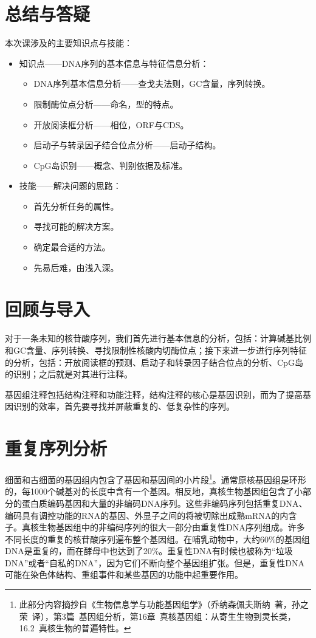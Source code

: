 \documentclass[11pt,a4paper,twoside]{book}
\begin{document}
\section{总结与答疑}
本次课涉及的主要知识点与技能：
\begin{itemize}
  \item 知识点——DNA序列的基本信息与特征信息分析：
    \begin{itemize}
      \item DNA序列基本信息分析——查戈夫法则，GC含量，序列转换。
      \item 限制酶位点分析——命名，型的特点。
      \item 开放阅读框分析——相位，ORF与CDS。
      \item 启动子与转录因子结合位点分析——启动子结构。
      \item CpG岛识别——概念、判别依据及标准。
    \end{itemize}
  \item 技能——解决问题的思路：
    \begin{itemize}
      \item 首先分析任务的属性。
      \item 寻找可能的解决方案。
      \item 确定最合适的方法。
      \item 先易后难，由浅入深。
    \end{itemize}
\end{itemize}

\section{回顾与导入}
对于一条未知的核苷酸序列，我们首先进行基本信息的分析，包括：计算碱基比例和GC含量、序列转换、寻找限制性核酸内切酶位点；接下来进一步进行序列特征的分析，包括：开放阅读框的预测、启动子和转录因子结合位点的分析、CpG岛的识别；之后就是对其进行注释。

基因组注释包括结构注释和功能注释，结构注释的核心是基因识别，而为了提高基因识别的效率，首先要寻找并屏蔽重复的、低复杂性的序列。

\section{重复序列分析}
细菌和古细菌的基因组内包含了基因和基因间的小片段\footnote{此部分内容摘抄自《生物信息学与功能基因组学》（乔纳森\textbullet 佩夫斯纳\ 著，孙之荣\ 译），第3篇\ 基因组分析，第16章\ 真核基因组：从寄生生物到灵长类，16.2\ 真核生物的普遍特性。}。通常原核基因组是环形的，每1000个碱基对的长度中含有一个基因。相反地，真核生物基因组包含了小部分的蛋白质编码基因和大量的非编码DNA序列。这些非编码序列包括重复DNA、编码具有调控功能的RNA的基因、外显子之间的将被切除出成熟mRNA的内含子。真核生物基因组中的非编码序列的很大一部分由重复性DNA序列组成。许多不同长度的重复的核苷酸序列遍布整个基因组。在哺乳动物中，大约60\%的基因组DNA是重复的，而在酵母中也达到了20\%。重复性DNA有时候也被称为“垃圾DNA”或者“自私的DNA”，因为它们不断向整个基因组扩张。但是，重复性DNA可能在染色体结构、重组事件和某些基因的功能中起重要作用。
\end{document}
